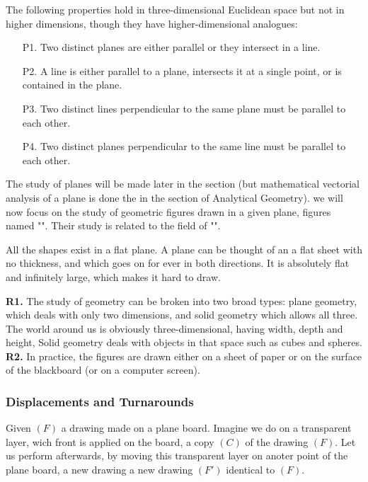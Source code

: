 	The following properties hold in three-dimensional Euclidean space but not in higher dimensions, though they have higher-dimensional analogues:
	\begin{enumerate}
		\item[P1.] Two distinct planes are either parallel or they intersect in a line.
		\item[P2.] A line is either parallel to a plane, intersects it at a single point, or is contained in the plane.
		\item[P3.] Two distinct lines perpendicular to the same plane must be parallel to each other.
		\item[P4.] Two distinct planes perpendicular to the same line must be parallel to each other.
	\end{enumerate}
	
	The study of planes will be made later in the section (but mathematical vectorial analysis of a plane is done the in the section of Analytical Geometry). we will now focus on the study of geometric figures drawn in a given plane, figures named "". Their study is related to the field of "".
	
	All the shapes exist in a flat plane. A plane can be thought of an a flat sheet with no thickness, and which goes on for ever in both directions. It is absolutely flat and infinitely large, which makes it hard to draw.
	
	\begin{tcolorbox}[title=Remarks,colframe=black,arc=10pt]
	\textbf{R1.} The study of geometry can be broken into two broad types: plane geometry, which deals with only two dimensions, and solid geometry which allows all three. The world around us is obviously three-dimensional, having width, depth and height, Solid geometry deals with objects in that space such as cubes and spheres.\\
	
	\textbf{R2.} In practice, the figures are drawn either on a sheet of paper or on the surface of the blackboard (or on a computer screen).
	\end{tcolorbox}
	
	\subsubsection{Displacements and Turnarounds}
	Given $(F)$ a drawing made on a plane board. Imagine we do on a transparent layer, wich front  is applied on the board, a copy $(C)$ of the drawing $(F)$. Let us perform afterwards, by moving this transparent layer on anoter point of the plane board, a new drawing a new drawing $(F ')$ identical to $(F)$.
	
